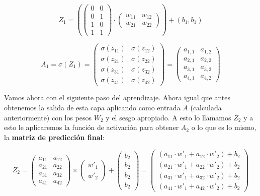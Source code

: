 \documentclass[a4paper,11pt]{article}
\renewenvironment{equation}{\begin{equation*}}{\end{equation*}}
\let\oldequation\equation
\let\endoldequation\endequation
\renewenvironment{equation}
  {\vspace{0.5em}\oldequation}
  {\endoldequation\vspace{0.5em}}
\begin{document}
\begin{equation}
Z_1 = \left( \begin{pmatrix} 0 & 0 \\ 0 & 1 \\ 1 & 0 \\ 1 & 1 \end{pmatrix} \cdot \begin{pmatrix} w_{11} & w_{12} \\ w_{21} & w_{22} \end{pmatrix} \right) + (b_1,b_1)
\end{equation}

\begin{equation}A_1 = \sigma(Z_1) = \begin{pmatrix} \sigma(z_{11}) & \sigma(z_{12}) \\ \sigma(z_{21}) & \sigma(z_{22}) \\ \sigma(z_{31}) & \sigma(z_{32}) \\ \sigma(z_{41}) & \sigma(z_{42}) \end{pmatrix} = \begin{pmatrix} a_{1,1} & a_{1,2} \\ a_{2,1} & a_{2,2} \\ a_{3,1} & a_{3,2} \\ a_{4,1} & a_{4,2} \end{pmatrix}
\end{equation}

Vamos ahora con el siguiente paso del aprendizaje. Ahora igual que antes
obtenemos la salida de esta capa aplicando como entrada \(A\) (calculada
anteriormente) con los pesos \(W_2\) y el sesgo apropiado. A esto lo
llamamos \(Z_2\) y a esto le aplicaremos la función de activación para
obtener \(A_2\) o lo que es lo mismo, la \textbf{matriz de predicción
final}:

\begin{equation}
Z_2 = \begin{pmatrix} a_{11} & a_{12} \\ a_{21} & a_{22} \\ a_{31} & a_{32}
  \\ a_{41} & a_{42} \end{pmatrix} \times \begin{pmatrix} w'_{1}
  \\ w'_{2} \end{pmatrix} + \begin{pmatrix} b_{2} \\ b_{2} \\ b_{2}
  \\ b_{2} \end{pmatrix} = \begin{pmatrix} (a_{11} \cdot w'_{1} + a_{12} \cdot w'_{2}) + b_{2} \\ (a_{21} \cdot w'_{1} + a_{22} \cdot w'_{2}) + b_{2} \\ (a_{31} \cdot w'_{1} + a_{32} \cdot w'_{2}) + b_{2} \\ (a_{41} \cdot w'_{1} + a_{42} \cdot w'_{2}) + b_{2} \end{pmatrix}
\end{equation}
\end{document}
